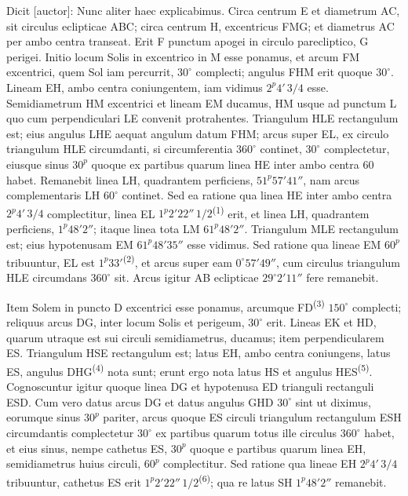 \documentclass[10pt]{article}
\newcommand{\A}[1]{\hypertarget{#1}{}}
\newcommand{\NM}[1]{\textsuperscript{(#1)}}
\begin{document}
\A{AB01-PDF0136-P01}
Dicit [auctor]: Nunc aliter haec explicabimus. Circa centrum E
et diametrum AC, sit circulus eclipticae ABC; circa centrum H,
excentricus FMG; et diametrus AC per ambo centra transeat.
Erit F punctum apogei in circulo parecliptico, G perigei.
Initio locum Solis in excentrico in M esse ponamus, et arcum FM
excentrici, quem Sol iam percurrit, $30^\circ$ complecti;
angulus FHM erit quoque $30^\circ$. Lineam EH, ambo centra
coniungentem, iam vidimus $2^{p}4'\,3/4$ esse.
Semidiametrum HM excentrici et lineam EM ducamus, HM usque
ad punctum L quo cum perpendiculari LE convenit protrahentes.
Triangulum HLE rectangulum est; eius angulus LHE aequat
angulum datum FHM; arcus super EL, ex circulo triangulum
HLE circumdanti, si circumferentia $360^\circ$ continet,
$30^\circ$ complectetur, eiusque sinus $30^{p}$ quoque ex
partibus quarum linea HE inter ambo centra 60 habet.
Remanebit linea LH, quadrantem perficiens, $51^{p}57'41''$,
nam arcus complementaris LH $60^\circ$ continet.
Sed ea ratione qua linea HE inter ambo centra $2^{p}4'\,3/4$
complectitur, linea EL $1^{p}2'22''\,1/2$\NM{1} erit, et linea
LH, quadrantem perficiens, $1^{p}48'2''$; itaque linea tota
LM $61^{p}48'2''$. Triangulum MLE rectangulum est;
eius hypotenusam EM $61^{p}48'35''$ esse vidimus.
Sed ratione qua lineae EM $60^{p}$ tribuuntur, EL est
$1^{p}33'$\NM{2}, et arcus super eam $0^\circ57'49''$,
cum circulus triangulum HLE circumdans $360^\circ$ sit.
Arcus igitur AB eclipticae $29^\circ2'11''$ fere remanebit.

\A{AB01-PDF0136-P02}
Item Solem in puncto D excentrici esse ponamus, arcumque
FD\NM{3} $150^\circ$ complecti; reliquus arcus DG, inter
locum Solis et perigeum, $30^\circ$ erit. Lineas EK et HD,
quarum utraque est sui circuli semidiametrus, ducamus;
item perpendicularem ES. Triangulum HSE rectangulum est;
latus EH, ambo centra coniungens, latus ES, angulus
DHG\NM{4} nota sunt; erunt ergo nota latus HS et angulus
HES\NM{5}. Cognoscuntur igitur quoque linea DG et hypotenusa
ED trianguli rectanguli ESD. Cum vero datus arcus DG et
datus angulus GHD $30^\circ$ sint ut diximus, eorumque sinus
$30^{p}$ pariter, arcus quoque ES circuli triangulum
rectangulum ESH circumdantis complectetur $30^\circ$ ex
partibus quarum totus ille circulus $360^\circ$ habet,
et eius sinus, nempe cathetus ES, $30^{p}$ quoque e
partibus quarum linea EH, semidiametrus huius circuli,
$60^{p}$ complectitur. Sed ratione qua lineae EH
$2^{p}4'\,3/4$ tribuuntur, cathetus ES erit
$1^{p}2'22''\,1/2$\NM{6}; qua re latus SH $1^{p}48'2''$
remanebit.
\end{document}
